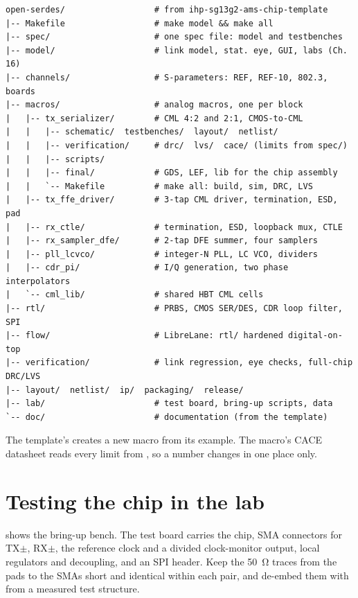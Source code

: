 \begin{lstlisting}[style=shell,language={},basicstyle=\ttfamily\scriptsize]
open-serdes/                  # from ihp-sg13g2-ams-chip-template
|-- Makefile                  # make model && make all
|-- spec/                     # one spec file: model and testbenches
|-- model/                    # link model, stat. eye, GUI, labs (Ch. 16)
|-- channels/                 # S-parameters: REF, REF-10, 802.3, boards
|-- macros/                   # analog macros, one per block
|   |-- tx_serializer/        # CML 4:2 and 2:1, CMOS-to-CML
|   |   |-- schematic/  testbenches/  layout/  netlist/
|   |   |-- verification/     # drc/  lvs/  cace/ (limits from spec/)
|   |   |-- scripts/
|   |   |-- final/            # GDS, LEF, lib for the chip assembly
|   |   `-- Makefile          # make all: build, sim, DRC, LVS
|   |-- tx_ffe_driver/        # 3-tap CML driver, termination, ESD, pad
|   |-- rx_ctle/              # termination, ESD, loopback mux, CTLE
|   |-- rx_sampler_dfe/       # 2-tap DFE summer, four samplers
|   |-- pll_lcvco/            # integer-N PLL, LC VCO, dividers
|   |-- cdr_pi/               # I/Q generation, two phase interpolators
|   `-- cml_lib/              # shared HBT CML cells
|-- rtl/                      # PRBS, CMOS SER/DES, CDR loop filter, SPI
|-- flow/                     # LibreLane: rtl/ hardened digital-on-top
|-- verification/             # link regression, eye checks, full-chip DRC/LVS
|-- layout/  netlist/  ip/  packaging/  release/
|-- lab/                      # test board, bring-up scripts, data
`-- doc/                      # documentation (from the template)
\end{lstlisting}

The template's  creates a new macro from its example. The macro's CACE datasheet reads every limit from , so a number changes in one place only.

\section{Testing the chip in the lab}\label{sec:labtest}

 shows the bring-up bench. The test board carries the chip, SMA connectors for TX$\pm$, RX$\pm$, the reference clock and a divided clock-monitor output, local regulators and decoupling, and an SPI header. Keep the \qty{50}{\ohm} traces from the pads to the SMAs short and identical within each pair, and de-embed them with  from a measured test structure.


